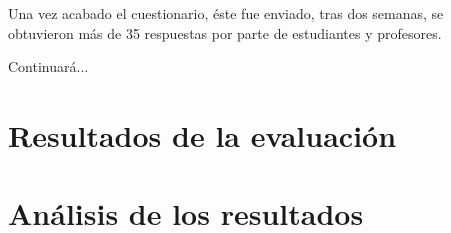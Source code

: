 Una vez acabado el cuestionario, éste fue enviado, tras dos semanas, se obtuvieron más de 35 respuestas por parte de estudiantes y profesores. 

Continuará...

\section{Resultados de la evaluación}
\label{eva:res}

\section{Análisis de los resultados}
\label{eva:analisis}